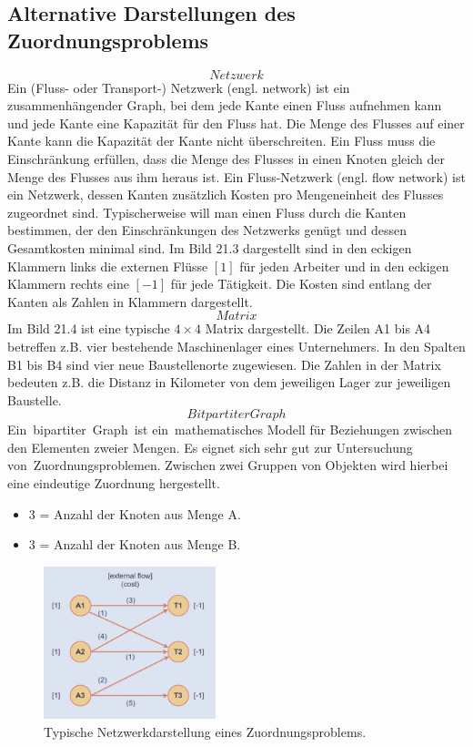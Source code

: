\subsection{Alternative Darstellungen des Zuordnungsproblems
\label{munkres:subsection:bonorum}}
\begin{equation}
Netzwerk
\end{equation}
Ein (Fluss- oder Transport-) Netzwerk (engl. network) ist ein zusammenhängender Graph, bei dem jede Kante einen Fluss aufnehmen kann und jede Kante eine Kapazität für den Fluss hat. Die Menge des Flusses auf einer Kante kann die Kapazität der Kante nicht überschreiten. Ein Fluss muss die Einschränkung erfüllen, dass die Menge des Flusses in einen Knoten gleich der Menge des Flusses aus ihm heraus ist. Ein Fluss-Netzwerk (engl. flow network) ist ein Netzwerk, dessen Kanten zusätzlich Kosten pro Mengeneinheit des Flusses zugeordnet sind. Typischerweise will man einen Fluss durch die Kanten bestimmen, der den Einschränkungen des Netzwerks genügt und dessen Gesamtkosten minimal sind. Im Bild 21.3 dargestellt sind in den eckigen Klammern links die externen Flüsse $[1]$ für jeden Arbeiter und in den eckigen Klammern rechts eine $[-1]$ für jede Tätigkeit. Die Kosten sind entlang der Kanten als Zahlen in Klammern dargestellt.  
\begin{equation}
Matrix
\end{equation}
Im Bild 21.4 ist eine typische $4\times 4$ Matrix dargestellt. Die Zeilen A1 bis A4 betreffen z.B. vier bestehende Maschinenlager eines Unternehmers. In den Spalten B1 bis B4 sind vier neue Baustellenorte zugewiesen. Die Zahlen in der Matrix bedeuten z.B. die Distanz in Kilometer von dem jeweiligen Lager zur jeweiligen Baustelle.
\begin{equation}
Bitpartiter Graph
\end{equation}
Ein bipartiter Graph ist ein mathematisches Modell für Beziehungen
zwischen den Elementen zweier Mengen. Es eignet sich sehr gut zur Untersuchung von Zuordnungsproblemen. Zwischen zwei Gruppen von Objekten wird hierbei eine eindeutige Zuordnung hergestellt.
\begin{itemize}
\item 3 = Anzahl der Knoten aus Menge A.
\item 3 = Anzahl der Knoten aus Menge B.
\end{itemize}


\begin{figure}
\centering
\includegraphics[width=5cm]{papers/munkres/figures/Netzwerkdarstellung}
\caption{Typische Netzwerkdarstellung eines Zuordnungsproblems.}
\label{munkres:Vr2}
\end{figure}


